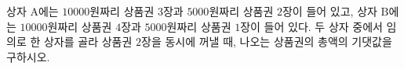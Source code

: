 상자 $\mathrm{A}$에는 $10000$원짜리 상품권 $3$장과 $5000$원짜리 상품권 $2$장이 들어 있고, 상자 $\mathrm{B}$에는 $10000$원짜리 상품권 $4$장과 $5000$원짜리 상품권 $1$장이 들어 있다. 두 상자 중에서 임의로 한 상자를 골라 상품권 $2$장을 동시에 꺼낼 때, 나오는 상품권의 총액의 기댓값을 구하시오.
